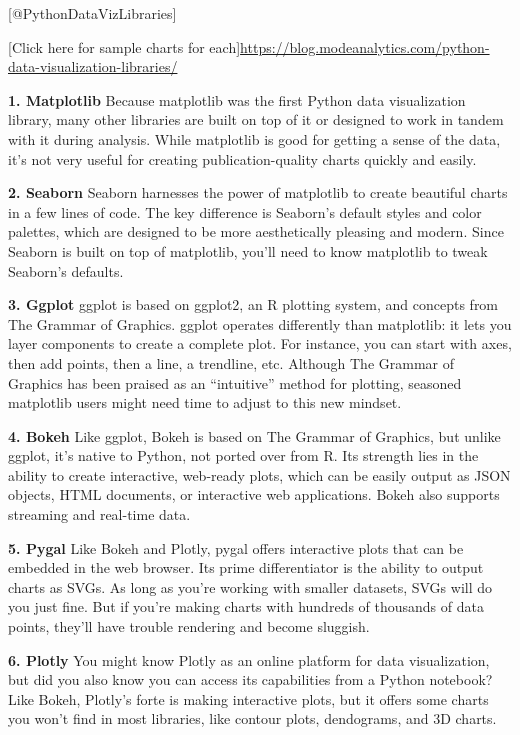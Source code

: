 \documentclass[]{book}
\theoremstyle{definition}
\theoremstyle{definition}
\theoremstyle{definition}
\theoremstyle{remark}
\begin{document}
{[}@PythonDataVizLibraries{]}

{[}Click here for sample charts for
each{]}\url{https://blog.modeanalytics.com/python-data-visualization-libraries/}

\textbf{1. Matplotlib} Because matplotlib was the first Python data
visualization library, many other libraries are built on top of it or
designed to work in tandem with it during analysis. While matplotlib is
good for getting a sense of the data, it's not very useful for creating
publication-quality charts quickly and easily.

\textbf{2. Seaborn} Seaborn harnesses the power of matplotlib to create
beautiful charts in a few lines of code. The key difference is Seaborn's
default styles and color palettes, which are designed to be more
aesthetically pleasing and modern. Since Seaborn is built on top of
matplotlib, you'll need to know matplotlib to tweak Seaborn's defaults.

\textbf{3. Ggplot} ggplot is based on ggplot2, an R plotting system, and
concepts from The Grammar of Graphics. ggplot operates differently than
matplotlib: it lets you layer components to create a complete plot. For
instance, you can start with axes, then add points, then a line, a
trendline, etc. Although The Grammar of Graphics has been praised as an
``intuitive'' method for plotting, seasoned matplotlib users might need
time to adjust to this new mindset.

\textbf{4. Bokeh} Like ggplot, Bokeh is based on The Grammar of
Graphics, but unlike ggplot, it's native to Python, not ported over from
R. Its strength lies in the ability to create interactive, web-ready
plots, which can be easily output as JSON objects, HTML documents, or
interactive web applications. Bokeh also supports streaming and
real-time data.

\textbf{5. Pygal} Like Bokeh and Plotly, pygal offers interactive plots
that can be embedded in the web browser. Its prime differentiator is the
ability to output charts as SVGs. As long as you're working with smaller
datasets, SVGs will do you just fine. But if you're making charts with
hundreds of thousands of data points, they'll have trouble rendering and
become sluggish.

\textbf{6. Plotly} You might know Plotly as an online platform for data
visualization, but did you also know you can access its capabilities
from a Python notebook? Like Bokeh, Plotly's forte is making interactive
plots, but it offers some charts you won't find in most libraries, like
contour plots, dendograms, and 3D charts.
\end{document}
